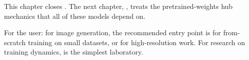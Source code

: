 This chapter closes . The next chapter,
, treats the pretrained-weights hub
mechanics that all of these models depend on.

\begin{lucidnote}
For the user: for image generation, the recommended entry
point is  for from-scratch training on small
datasets, or  for high-resolution work. For
research on training dynamics,  is the simplest
laboratory.
\end{lucidnote}
